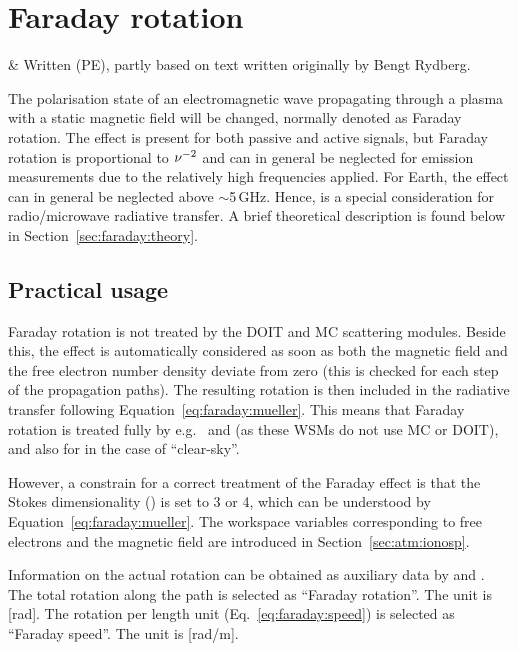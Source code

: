 \chapter{Faraday rotation}
 \label{sec:faraday}

 & Written (PE), partly based on text written originally by 
          Bengt Rydberg.
\stophistory

The polarisation state of an electromagnetic wave propagating through a plasma
with a static magnetic field will be changed, normally denoted as Faraday
rotation. The effect is present for both passive and active signals, but
Faraday rotation is proportional to $\nu^{-2}$ and can in general be neglected
for emission measurements due to the relatively high frequencies applied. For
Earth, the effect can in general be neglected above
$\sim$5\,GHz. Hence,  is a special consideration
for radio/microwave radiative transfer. A brief theoretical description is
found below in Section~\ref{sec:faraday:theory}. 



\section{Practical usage}
\label{sec:faraday:arts}
%
Faraday rotation is not treated by the DOIT and MC scattering modules.
Beside this, the effect is automatically considered as soon as both the
magnetic field and the free electron number density deviate from zero (this is
checked for each step of the propagation paths). The resulting
rotation is then included in the radiative transfer following
Equation~\ref{eq:faraday:mueller}. This means that Faraday rotation is treated
fully by e.g.\  and
 (as these WSMs do not use MC or DOIT), and also for 
 in the case of ``clear-sky''. 

However, a constrain for a correct treatment of the Faraday effect is that the
Stokes dimensionality () is set to 3 or 4, which can be
understood by Equation~\ref{eq:faraday:mueller}. The workspace variables
corresponding to free electrons and the magnetic field are introduced in
Section~\ref{sec:atm:ionosp}.

Information on the actual rotation can be obtained as auxiliary data by
 and . The total
rotation along the path is selected as ``Faraday rotation''. The unit is [rad].
The rotation per length unit (Eq.~\ref{eq:faraday:speed}) is selected as
``Faraday speed''. The unit is [rad/m].




